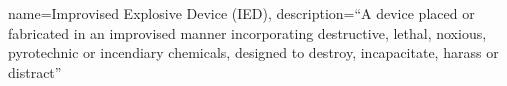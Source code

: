 





{
	name={Improvised Explosive Device (IED)},
	description={``A device placed or fabricated in an improvised manner incorporating destructive, lethal, noxious, pyrotechnic or incendiary chemicals, designed to destroy, incapacitate, harass or distract'' \parencite[50]{DORD_2022}}
}
